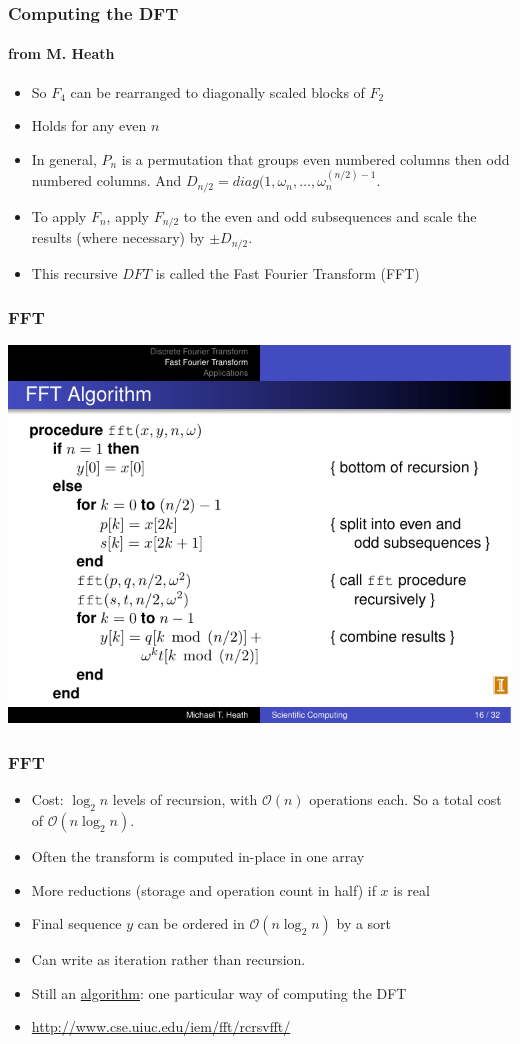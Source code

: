 \documentclass[10pt]{beamer}
\newcommand{\mO}{{\mathcal{O}}}
\begin{document}
\begin{frame}
\frametitle{Computing the DFT}
\framesubtitle{from M. Heath}
\begin{itemize}
  \item So $F_4$ can be rearranged to diagonally scaled blocks of $F_2$
  \item Holds for any even $n$
  \item In general, $P_n$ is a permutation that groups even numbered columns
then odd numbered columns.  And $D_{n/2} =
diag(1,\omega_n,\dots,\omega_n^{(n/2)-1}$.
  \item To apply $F_n$, apply $F_{n/2}$ to the even and odd subsequences and
scale the results (where necessary) by $\pm D_{n/2}$.
  \item This recursive $DFT$ is called the Fast Fourier Transform (FFT)
\end{itemize}
\end{frame}
\begin{frame}
\frametitle{FFT}
\begin{center}
  \includegraphics[width=\textwidth]{./figs/fft_alg}
\end{center}
\end{frame}
\begin{frame}
\frametitle{FFT}
\begin{itemize}
  \item Cost: $\log_2 n$ levels of recursion, with $\mO(n)$ operations each.  So
a total cost of $\mO(n\log_2 n)$.
  \item Often the transform is computed in-place in one array
  \item More reductions (storage and operation count in half) if $x$ is real
  \item Final sequence $y$ can be ordered in $\mO(n \log_2 n)$ by a sort
  \item Can write as iteration rather than recursion.
  \item Still an {{\underline{algorithm}}}: one particular way of computing the
DFT
  \item \url{http://www.cse.uiuc.edu/iem/fft/rcrsvfft/}
\end{itemize}
\end{frame}
\end{document}
